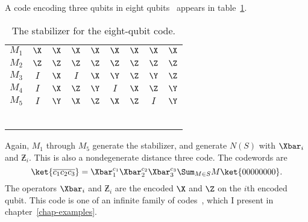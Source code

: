 A code encoding three qubits in eight
qubits~\cite{gottesman-stab,calderbank-stab,steane-8qubit} appears in
table~\ref{table-8qubit}.
\begin{table}
	\centering
	\begin{tabular}{c|cccccccc}
		$M_1$ & $\X$ & $\X$ & $\X$ & $\X$ & $\X$ & $\X$ & $\X$ & $\X$ \\
		$M_2$ & $\Z$ & $\Z$ & $\Z$ & $\Z$ & $\Z$ & $\Z$ & $\Z$ & $\Z$ \\
		$M_3$ & $I$ & $\X$ & $I$ & $\X$ & $\Y$ & $\Z$ & $\Y$ & $\Z$ \\
		$M_4$ & $I$ & $\X$ & $\Z$ & $\Y$ & $I$ & $\X$ & $\Z$ & $\Y$ \\
		$M_5$ & $I$ & $\Y$ & $\X$ & $\Z$ & $\X$ & $\Z$ & $I$ & $\Y$ \\
		\hline
		\low{$\Xbar_1$} & \low{$\X$} & \low{$\X$} & \low{$I$} & \low{$I$} & \low{$I$} &
		\low{$\Z$} & \low{$I$} & \low{$\Z$} \\
		\low{$\Xbar_2$} & \low{$\X$} & \low{$I$} & \low{$\X$} & \low{$\Z$} & \low{$I$}
		& \low{$I$} & \low{$\Z$} & \low{$I$} \\
		\low{$\Xbar_3$} & \low{$\X$} & \low{$I$} & \low{$I$} & \low{$\Z$} & \low{$\X$}
		& \low{$\Z$} & \low{$I$} & \low{$I$} \\
		\low{$\Zbar_1$} & \low{$I$} & \low{$\Z$} & \low{$I$} & \low{$\Z$} & \low{$I$} &
		\low{$\Z$} & \low{$I$} & \low{$\Z$} \\
		\low{$\Zbar_2$} & \low{$I$} & \low{$I$} & \low{$\Z$} & \low{$\Z$} & \low{$I$} & \low{$I$} & \low{$\Z$} & \low{$\Z$} \\
		\low{$\Zbar_3$} & \low{$I$} & \low{$I$} & \low{$I$} & \low{$I$} & \low{$\Z$} &
		\low{$\Z$} & \low{$\Z$} & \low{$\Z$}
	\end{tabular}
	\caption{The stabilizer for the eight-qubit code.}
	\label{table-8qubit}
\end{table}
Again, $M_1$ through $M_5$ generate the stabilizer, and generate $N(S)$ with
$\Xbar_i$ and $\Zbar_i$.  This is also a nondegenerate distance three
code.  The codewords are
\begin{equation}
	\ket{\overline{c_1 c_2 c_3}} = \Xbar_1^{c_1} \Xbar_2^{c_2} \Xbar_3^{c_3}
	\Sum_{M \in S} M \ket{00000000}.
\end{equation}
The operators $\Xbar_i$ and $\Zbar_i$ are the encoded $\X$ and $\Z$ on
the $i$th encoded qubit.  This code is one of an infinite family of
codes~\cite{gottesman-stab,steane-RM}, which I present in
chapter~\ref{chap-examples}.

